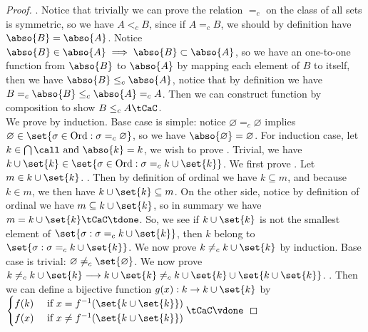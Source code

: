 \documentclass{report}
\begin{document}
\begin{proof}
. Notice that trivially we can prove the relation $=_c$ on the class of all sets is symmetric, so we have $A<_c B$, since if $A=_c B$, we should by definition have $\abso{B}=\abso{A}$. Notice $\abso{B}\in \abso{A}\implies \abso{B}\subset \abso{A}$, so we have an one-to-one function from $\abso{B}$ to $\abso{A}$ by mapping each element of $B$ to itself, then we have $\abso{B}\leq_c \abso{A}$, notice that by definition we have $B=_c \abso{B}\leq _c \abso{A}=_c A$. Then we can construct function by composition to show $B\leq _c A\tCaC$.\\




We prove by induction. Base case is simple: notice $\varnothing=_c \varnothing$ implies $\varnothing \in \set{\sigma \in\text{Ord}:\sigma =_c \varnothing}$, so we have $\abso{\varnothing}=\varnothing$. For induction case, let $k\in \bigcap \call \text{ and }\abso{k}=k$, we wish to prove . Trivial, we have $k\cup \set{k}\in \set{\sigma\in\text{Ord}:\sigma=_c k \cup \set{k}}$. We first prove . Let $m \in k\cup \set{k}$. . Then by definition of ordinal we  have  $k\subseteq m$, and because $k \in m$, we then have $k\cup \set{k}\subseteq m$. On the other side, notice by definition of ordinal we have $m\subseteq k\cup \set{k}$, so in summary we have $m=k\cup \set{k}\tCaC\tdone$. So, we see if $k\cup \set{k}$ is not the smallest element of $\set{\sigma:\sigma=_c k\cup \set{k}}$, then $k$ belong to  $\set{\sigma:\sigma=_c k \cup \set{k}}$. We now prove $k\neq_c k\cup \set{k}$ by induction. Base case is trivial: $\varnothing\neq _c \set{\varnothing}$. We now prove $k\neq _c k \cup \set{k}\longrightarrow k\cup \set{k}\neq _c k\cup \set{k}\cup \set{k \cup \set{k}}$. . Then we can define a bijective function $g(x):k\rightarrow k\cup \set{k}$ by $\begin{cases}f(k)& \text{ if  }x=f^{-1}(\set{k\cup \set{k}})\\
  f(x)& \text{ if  }x\neq f^{-1}(\set{k\cup \set{k}})
\end{cases}\tCaC\vdone$
\end{proof}
\end{document}
